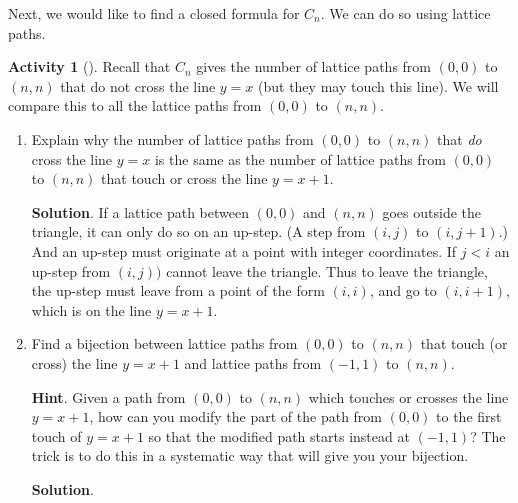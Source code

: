 \documentclass[10pt,]{book}
\theoremstyle{plain}
\theoremstyle{definition}
\theoremstyle{definition}
\theoremstyle{definition}
\newtheorem{activity}[project]{Activity}
\numberwithin{equation}{chapter}
\newcommand{\lt}{<}
\begin{document}
\hypertarget{p-1027}{}%
Next, we would like to find a closed formula for \(C_n\).  We can do so using lattice paths.%
\begin{activity}[]\label{activity-175}
\hypertarget{p-1028}{}%
Recall that \(C_n\) gives the number of lattice paths from \((0,0)\) to \((n,n)\) that do not cross the line \(y = x\) (but they may touch this line).  We will compare this to all the lattice paths from \((0,0)\) to \((n,n)\).%
\begin{enumerate}[font=\bfseries,label=(\alph*),ref=\alph*]
\item\label{task-192} \hypertarget{p-1029}{}%
Explain why the number of lattice paths from \((0,0)\) to \((n,n)\) that \emph{do} cross the line \(y = x\) is the same as the number of lattice paths from \((0,0)\) to \((n,n)\) that touch or cross the line \(y = x + 1\).%
\par\smallskip%
\noindent\textbf{Solution}.\hypertarget{solution-78}{}\quad%
\hypertarget{p-1030}{}%
If a lattice path between \((0,0)\) and \((n,n)\) goes outside the triangle, it can only do so on an up-step. (A step from \((i,j)\) to \((i,j+1)\).) And an up-step must originate at a point with integer coordinates. If \(j\lt i\) an up-step from \((i,j))\) cannot leave the triangle. Thus to leave the triangle, the up-step must leave from a point of the form \((i,i)\), and go to \((i,i+1)\), which is on the line \(y=x+1\).%
\item\label{task-193} \hypertarget{p-1031}{}%
Find a bijection between lattice paths from \((0,0)\) to \((n,n)\) that touch (or cross) the line \(y=x+1\) and lattice paths from \((-1,1)\) to \((n,n)\).%
\par\smallskip%
\noindent\textbf{Hint}.\hypertarget{hint-122}{}\quad%
\hypertarget{p-1032}{}%
Given a path from \((0, 0)\) to \((n, n)\) which touches or crosses the line \(y = x + 1\), how can you modify the part of the path from \((0, 0)\) to the first touch of \(y = x + 1\) so that the modified path starts instead at \((-1, 1)\)? The trick is to do this in a systematic way that will give you your bijection.%
\par\smallskip%
\noindent\textbf{Solution}.\hypertarget{solution-79}{}\quad%
\hypertarget{p-1033}{}%

\end{enumerate}
\end{activity}
\end{document}
